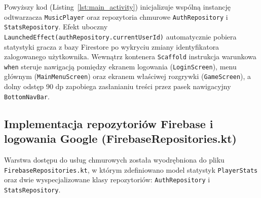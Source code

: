 \hspace{0.60cm}Powyższy kod (Listing~\ref{lst:main_activity}) inicjalizuje wspólną instancję odtwarzacza \texttt{MusicPlayer} oraz repozytoria chmurowe \texttt{AuthRepository} i \texttt{StatsRepository}. Efekt uboczny \texttt{LaunchedEffect(authRepository.currentUserId)} automatycznie pobiera statystyki gracza z bazy Firestore po wykryciu zmiany identyfikatora zalogowanego użytkownika. Wewnątrz kontenera \texttt{Scaffold} instrukcja warunkowa \texttt{when} steruje nawigacją pomiędzy ekranem logowania (\texttt{LoginScreen}), menu głównym (\texttt{MainMenuScreen}) oraz ekranem właściwej rozgrywki (\texttt{GameScreen}), a dolny odstęp $90\text{ dp}$ zapobiega zasłanianiu treści przez pasek nawigacyjny \texttt{BottomNavBar}.

\subsection{Implementacja repozytoriów Firebase i logowania Google (FirebaseRepositories.kt)}

\hspace{0.60cm}Warstwa dostępu do usług chmurowych została wyodrębniona do pliku \texttt{FirebaseRepositories.kt}, w którym zdefiniowano model statystyk \texttt{PlayerStats} oraz dwie wyspecjalizowane klasy repozytoriów: \texttt{AuthRepository} i \texttt{StatsRepository}.

